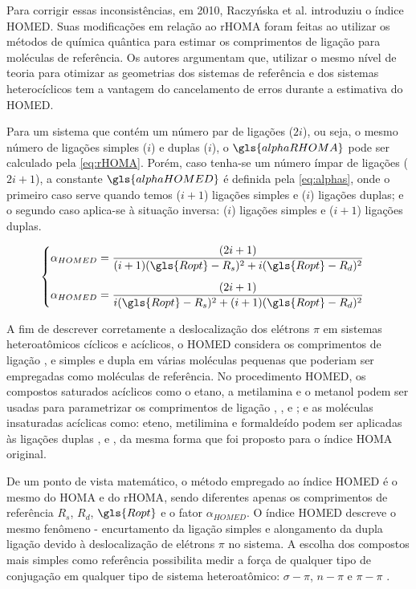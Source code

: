 Para corrigir essas inconsistências, em 2010, Raczyńska et al.\autocite{Raczyska2010} introduziu o índice \gls{HOMED}. Suas modificações em relação ao \gls{rHOMA} foram feitas ao utilizar os métodos de química quântica para estimar os comprimentos de ligação para moléculas de referência. Os autores argumentam que, utilizar o mesmo nível de teoria para otimizar as geometrias dos sistemas de referência e dos sistemas heterocíclicos tem a vantagem do cancelamento de erros durante a estimativa do \gls{HOMED}.

Para um sistema que contém um número par de ligações ($2i$), ou seja, o mesmo número de ligações simples ($i$) e duplas ($i$), o $\gls{alphaRHOMA}$ pode ser calculado pela \autoref{eq:rHOMA}. Porém, caso tenha-se um número ímpar de ligações ($2i + 1$), a constante $\gls{alphaHOMED}$ é definida pela \autoref{eq:alphas}, onde o primeiro caso serve quando temos ($i + 1$) ligações simples e ($i$) ligações duplas; e o segundo caso aplica-se à situação inversa: ($i$) ligações simples e ($i + 1$) ligações duplas.

\begin{equation}
\label{eq:alphas}
    \begin{cases}
        \alpha_{HOMED} = \displaystyle \frac{(2i + 1)}{(i+1)(\gls{Ropt} - R_s)^2 + i(\gls{Ropt} - R_d)^2} \\[0.50cm]
        \alpha_{HOMED} = \displaystyle \frac{(2i + 1)}{i(\gls{Ropt} - R_s)^2 + (i + 1)(\gls{Ropt} - R_d)^2}
    \end{cases}
\end{equation}

A fim de descrever corretamente a deslocalização dos elétrons $\pi$ em sistemas heteroatômicos cíclicos e acíclicos, o \gls{HOMED} considera os comprimentos de ligação ,  e  simples e dupla em várias moléculas pequenas que
poderiam ser empregadas como moléculas de referência. No procedimento \gls{HOMED}, os compostos saturados acíclicos como o etano, a metilamina e o metanol podem ser usadas para parametrizar os comprimentos de ligação , , e ; e as moléculas insaturadas acíclicas como: eteno, metilimina e formaldeído podem ser aplicadas às ligações duplas ,  e , da mesma forma que foi proposto para o índice \gls{HOMA} original. 

De um ponto de vista matemático, o método empregado ao índice \gls{HOMED} é o mesmo do \gls{HOMA} e do \gls{rHOMA}, sendo diferentes apenas os comprimentos de referência $R_s$, $R_d$, $\gls{Ropt}$
e o fator $\alpha_{HOMED}$. O índice \gls{HOMED} descreve o mesmo fenômeno -
encurtamento da ligação simples e alongamento da dupla ligação devido à deslocalização de elétrons $\pi$ no sistema. A escolha dos compostos mais simples como referência possibilita
medir a força de qualquer tipo de conjugação em qualquer tipo de sistema heteroatômico: $\sigma-\pi$, $n-\pi$
e $\pi-\pi$ \autocite{Kruszewski1972}.

